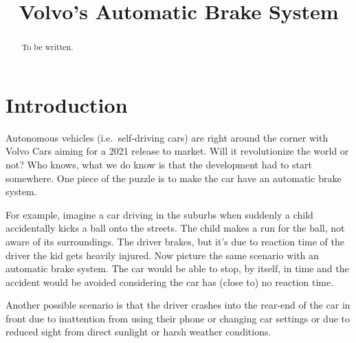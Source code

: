 \documentclass[conference]{IEEEtran}
\begin{document}
\title{Volvo's Automatic Brake System}

\author{
\and
{}
}

\maketitle

\begin{abstract}
To be written.
\end{abstract}


\section{Introduction}
Autonomous vehicles (i.e.\ self-driving cars) are right around the corner with Volvo Cars aiming for a 2021 release to market.\cite{ADToMarket} Will it revolutionize the world or not? Who knows, what we do know is that the development had to start somewhere. One piece of the puzzle is to make the car have an automatic brake system. 

For example, imagine a car driving in the suburbs when suddenly a child accidentally kicks a ball onto the streets. The child makes a run for the ball, not aware of its surroundings. The driver brakes, but it's due to reaction time of the driver the kid gets heavily injured. Now picture the same scenario with an automatic brake system. The car would be able to stop, by itself, in time and the accident would be avoided considering the car has (close to) no reaction time.

Another possible scenario is that the driver crashes into the rear-end of the car in front due to inattention from using their phone or changing car settings or due to reduced sight from direct sunlight or harsh weather conditions.
\end{document}

